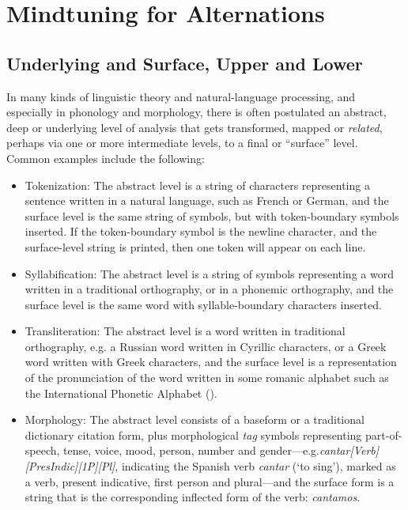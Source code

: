 \section{Mindtuning for Alternations}

\subsection{Underlying and Surface, Upper and Lower}

In many kinds of linguistic theory and natural-language processing, and especially in phonology and morphology, there
is often postulated an abstract, deep or underlying level of analysis
that gets transformed, mapped or \emph{related}, perhaps
via one or more intermediate levels, to a final or ``surface'' level.   Common examples include the following:

\begin{itemize}
\item
Tokenization:  The abstract level is a string of characters representing a 
sentence written in a natural language,
such as French or German, and the surface level is
the same string of symbols, but with token-boundary symbols inserted.  If the token-boundary symbol is the
newline character, and the surface-level string is printed, then one token will appear on each line.
\item
Syllabification:  The abstract level is a string of symbols representing a
word written in a traditional orthography, or in a phonemic orthography, and the
surface level is the same word with syllable-boundary characters inserted.
\item
Transliteration:  The abstract level is a word written in traditional orthography, e.g.\@
a Russian word written in
Cyrillic characters, or a Greek word written with Greek characters, 
and the surface level is a representation of
the pronunciation of the word written in some romanic alphabet such as
the International Phonetic Alphabet ().
\item
Morphology:  The abstract level consists of a baseform or a traditional
dictionary citation form, plus
morphological \emph{tag} symbols representing part-of-speech, tense, voice,
mood, person, number and gender---e.g.\@ \emph{cantar[Verb][PresIndic][1P][Pl]}, indicating the
Spanish verb \emph{cantar} (`to sing'), marked as a verb, present
indicative, first person and plural---and the surface form is a string
that is the
corresponding inflected form of the verb: \emph{cantamos}.
\end{itemize}

